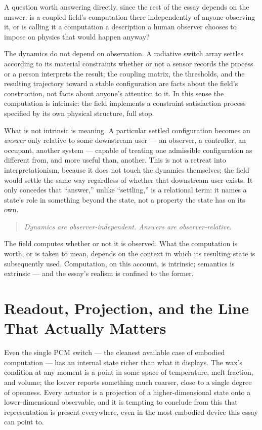 \documentclass[11pt]{article}
\begin{document}
A question worth answering directly, since the rest of the essay depends on the answer: is a coupled field's computation there independently of anyone observing it, or is calling it a computation a description a human observer chooses to impose on physics that would happen anyway?

The dynamics do not depend on observation. A radiative switch array settles according to its material constraints whether or not a sensor records the process or a person interprets the result; the coupling matrix, the thresholds, and the resulting trajectory toward a stable configuration are facts about the field's construction, not facts about anyone's attention to it. In this sense the computation is intrinsic: the field implements a constraint satisfaction process specified by its own physical structure, full stop.

What is not intrinsic is meaning. A particular settled configuration becomes an \emph{answer} only relative to some downstream user --- an observer, a controller, an occupant, another system --- capable of treating one admissible configuration as different from, and more useful than, another. This is not a retreat into interpretationism, because it does not touch the dynamics themselves; the field would settle the same way regardless of whether that downstream user exists. It only concedes that ``answer,'' unlike ``settling,'' is a relational term: it names a state's role in something beyond the state, not a property the state has on its own.

\begin{quote}
\itshape
Dynamics are observer-independent. Answers are observer-relative.
\end{quote}

\noindent The field computes whether or not it is observed. What the computation is worth, or is taken to mean, depends on the context in which its resulting state is subsequently used. Computation, on this account, is intrinsic; semantics is extrinsic --- and the essay's realism is confined to the former.

\section{Readout, Projection, and the Line That Actually Matters}

Even the single PCM switch --- the cleanest available case of embodied computation --- has an internal state richer than what it displays. The wax's condition at any moment is a point in some space of temperature, melt fraction, and volume; the louver reports something much coarser, close to a single degree of openness. Every actuator is a projection of a higher-dimensional state onto a lower-dimensional observable, and it is tempting to conclude from this that representation is present everywhere, even in the most embodied device this essay can point to.
\end{document}
